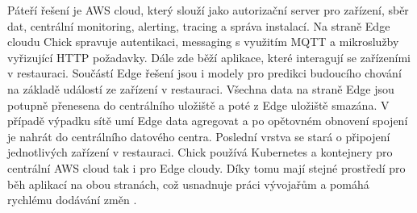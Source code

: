 	 Páteří řešení je AWS cloud, který slouží jako autorizační server pro zařízení, sběr dat, centrální monitoring, alerting, tracing a správa instalací. Na straně Edge cloudu Chick spravuje autentikaci, messaging s využitím MQTT a mikroslužby vyřizující HTTP požadavky. Dále zde běží aplikace, které interagují se zařízeními v restauraci. Součástí Edge řešení jsou i modely pro predikci budoucího chování na základě událostí ze zařízení v restauraci. Všechna data na straně Edge jsou potupně přenesena do centrálního uložiště a poté \linebreak z Edge uložiště smazána. V případě výpadku sítě umí Edge data agregovat a po opětovném obnovení spojení je nahrát do centrálního datového centra. Poslední vrstva se stará o připojení jednotlivých zařízení v restauraci. Chick používá Kubernetes a kontejnery pro centrální AWS cloud tak i pro Edge cloudy. Díky tomu mají stejné prostředí pro běh aplikací na obou stranách, což usnadnuje práci vývojařům a pomáhá rychlému dodávání změn \cite{chick-2}.

